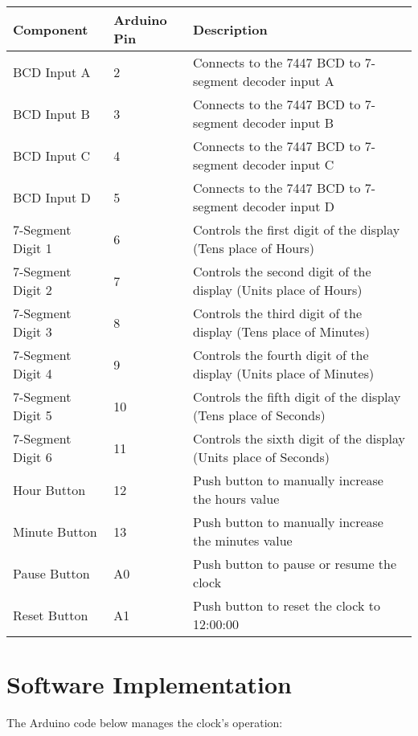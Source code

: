 \documentclass[a4paper,12pt]{article}
\theoremstyle{remark}
\begin{document}
\begin{table}[H]
    \centering
    \begin{tabular}{|l|l|p{8cm}|}
        \hline
        \textbf{Component} & \textbf{Arduino Pin} & \textbf{Description} \\
        \hline
        BCD Input A        & 2                   & Connects to the 7447 BCD to 7-segment decoder input A \\
        BCD Input B        & 3                   & Connects to the 7447 BCD to 7-segment decoder input B \\
        BCD Input C        & 4                   & Connects to the 7447 BCD to 7-segment decoder input C \\
        BCD Input D        & 5                   & Connects to the 7447 BCD to 7-segment decoder input D \\
        7-Segment Digit 1  & 6                   & Controls the first digit of the display (Tens place of Hours) \\
        7-Segment Digit 2  & 7                   & Controls the second digit of the display (Units place of Hours) \\
        7-Segment Digit 3  & 8                   & Controls the third digit of the display (Tens place of Minutes) \\
        7-Segment Digit 4  & 9                   & Controls the fourth digit of the display (Units place of Minutes) \\
        7-Segment Digit 5  & 10                  & Controls the fifth digit of the display (Tens place of Seconds) \\
        7-Segment Digit 6  & 11                  & Controls the sixth digit of the display (Units place of Seconds) \\
        Hour Button        & 12                  & Push button to manually increase the hours value \\
        Minute Button      & 13                  & Push button to manually increase the minutes value \\
        Pause Button       & A0                  & Push button to pause or resume the clock \\
        Reset Button       & A1                  & Push button to reset the clock to 12:00:00 \\
        \hline
    \end{tabular}
\end{table}
\section{Software Implementation}
The Arduino code below manages the clock's operation:
\end{document}
